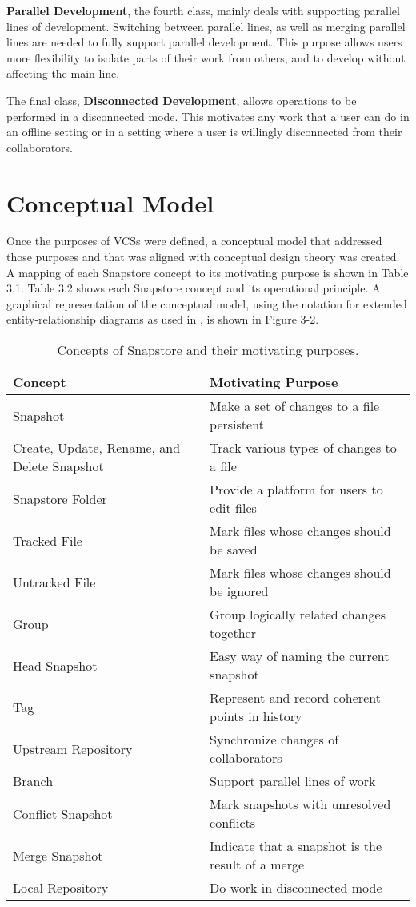 \textbf{Parallel Development}, the fourth class, mainly deals with supporting parallel lines of development. Switching between parallel lines, as well as merging parallel lines are needed to fully support parallel development. This purpose allows users more flexibility to isolate parts of their work from others, and to develop without affecting the main line.

The final class, \textbf{Disconnected Development}, allows operations to be performed in a disconnected mode. This motivates any work that a user can do in an offline setting or in a setting where a user is willingly disconnected from their collaborators.

\section{Conceptual Model}

Once the purposes of VCSs were defined, a conceptual model that addressed those purposes and that was aligned with conceptual design theory \cite{Jackson} was created. A mapping of each Snapstore concept to its motivating purpose is shown in Table 3.1. Table 3.2 shows each Snapstore concept and its operational principle. A graphical representation of the conceptual model, using the notation for extended entity-relationship diagrams as used in \cite{Jackson}, is shown in Figure 3-2.

\begin{table}
\begin{tabular}{ |p{5cm}||p{9cm}|}
 \hline
 \textbf{Concept} & \textbf{Motivating Purpose}\\[8pt]
 \hline
 Snapshot & Make a set of changes to a file persistent\\[8pt]
 Create, Update, Rename, and Delete Snapshot & Track various types of changes to a file\\[8pt]
 Snapstore Folder & Provide a platform for users to edit files\\[8pt]
 Tracked File & Mark files whose changes should be saved\\[8pt]
 Untracked File & Mark files whose changes should be ignored\\[8pt]
 \hline
 Group & Group logically related changes together\\[8pt]
 Head Snapshot & Easy way of naming the current snapshot\\[8pt]
 Tag & Represent and record coherent points in history\\[8pt]
 \hline
 Upstream Repository & Synchronize changes of collaborators\\[8pt]
 \hline
 Branch & Support parallel lines of work\\[8pt]
 Conflict Snapshot & Mark snapshots with unresolved conflicts\\[8pt]
 Merge Snapshot & Indicate that a snapshot is the result of a merge\\[8pt]
 \hline
 Local Repository & Do work in disconnected mode\\[8pt]
 \hline
\end{tabular}
\caption{Concepts of Snapstore and their motivating purposes.}
\end{table}

